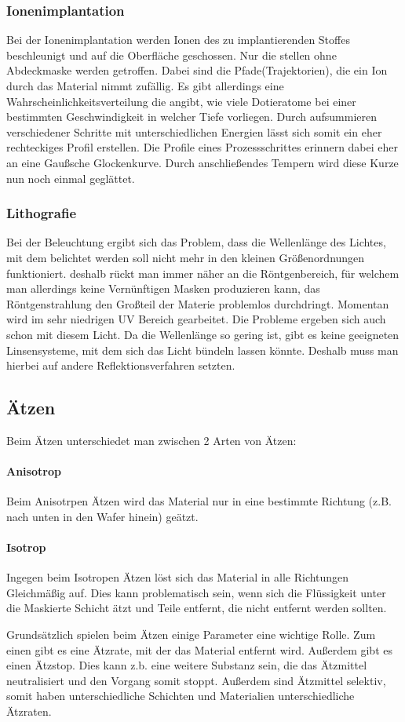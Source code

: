 	\subsubsection{Ionenimplantation}
	Bei der Ionenimplantation werden Ionen des zu implantierenden Stoffes beschleunigt und auf die Oberfläche geschossen. Nur die stellen ohne Abdeckmaske werden getroffen. Dabei sind die Pfade(Trajektorien), die ein Ion durch das Material nimmt zufällig. Es gibt allerdings eine Wahrscheinlichkeitsverteilung die angibt, wie viele Dotieratome bei einer bestimmten Geschwindigkeit in welcher Tiefe vorliegen. Durch aufsummieren verschiedener Schritte mit unterschiedlichen Energien lässt sich somit ein eher rechteckiges Profil erstellen. Die Profile eines Prozessschrittes erinnern dabei eher an eine Gaußsche Glockenkurve. Durch anschließendes Tempern wird diese Kurze nun noch einmal geglättet.
	\subsubsection{Lithografie}
	Bei der Beleuchtung ergibt sich das Problem, dass die Wellenlänge des Lichtes, mit dem belichtet werden soll nicht mehr in den kleinen Größenordnungen funktioniert. deshalb rückt man immer näher an die Röntgenbereich, für welchem man allerdings keine Vernünftigen Masken produzieren kann, das Röntgenstrahlung den Großteil der Materie problemlos durchdringt. Momentan wird im sehr niedrigen UV Bereich gearbeitet. Die Probleme ergeben sich auch schon mit diesem Licht. Da die Wellenlänge so gering ist, gibt es keine geeigneten Linsensysteme, mit dem sich das Licht bündeln lassen könnte. Deshalb muss man hierbei auf andere Reflektionsverfahren setzten.
	\subsection{Ätzen} Beim Ätzen unterschiedet man zwischen 2 Arten von Ätzen:
	
	\paragraph{Anisotrop} Beim Anisotrpen Ätzen wird das Material nur in eine bestimmte Richtung (z.B. nach unten in den Wafer hinein) geätzt. 
	
	\paragraph{Isotrop} Ingegen beim Isotropen Ätzen löst sich das Material in alle Richtungen Gleichmäßig auf. Dies kann problematisch sein, wenn sich die Flüssigkeit unter die Maskierte Schicht ätzt und Teile entfernt, die nicht entfernt werden sollten.
	
	Grundsätzlich spielen beim Ätzen einige Parameter eine wichtige Rolle. Zum einen gibt es eine Ätzrate, mit der das Material entfernt wird. Außerdem gibt es einen Ätzstop. Dies kann z.b. eine weitere Substanz sein, die das Ätzmittel neutralisiert und den Vorgang somit stoppt. Außerdem sind Ätzmittel selektiv, somit haben unterschiedliche Schichten und Materialien unterschiedliche Ätzraten.
	
